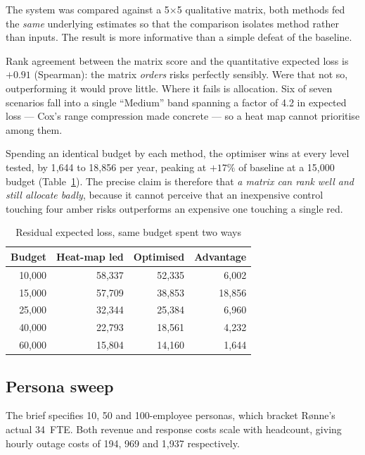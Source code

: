 \documentclass[conference]{IEEEtran}
\newcommand{\eur}{\mbox{\texteuro}}
\begin{document}
The system was compared against a 5$\times$5 qualitative matrix, both methods fed
the \emph{same} underlying estimates so that the comparison isolates method rather
than inputs. The result is more informative than a simple defeat of the baseline.

Rank agreement between the matrix score and the quantitative expected loss is
$+0.91$ (Spearman): the matrix \emph{orders} risks perfectly sensibly. Were that
not so, outperforming it would prove little. Where it fails is allocation. Six of
seven scenarios fall into a single ``Medium'' band spanning a factor of 4.2 in
expected loss --- Cox's range compression \cite{cox2008} made concrete --- so a heat
map cannot prioritise among them.

Spending an identical budget by each method, the optimiser wins at every level
tested, by \eur{}1{,}644 to \eur{}18{,}856 per year, peaking at $+17\%$ of baseline
at a \eur{}15{,}000 budget (Table~\ref{tab:duel}). The precise claim is therefore
that \emph{a matrix can rank well and still allocate badly}, because it cannot
perceive that an inexpensive control touching four amber risks outperforms an
expensive one touching a single red.

\begin{table}[t]
\caption{Residual expected loss, same budget spent two ways}
\label{tab:duel}
\centering
\footnotesize
\begin{tabular}{@{}rrrr@{}}
\toprule
\textbf{Budget} & \textbf{Heat-map led} & \textbf{Optimised} & \textbf{Advantage} \\
\midrule
\eur{}10,000 & \eur{}58,337 & \eur{}52,335 & \eur{}6,002 \\
\eur{}15,000 & \eur{}57,709 & \eur{}38,853 & \eur{}18,856 \\
\eur{}25,000 & \eur{}32,344 & \eur{}25,384 & \eur{}6,960 \\
\eur{}40,000 & \eur{}22,793 & \eur{}18,561 & \eur{}4,232 \\
\eur{}60,000 & \eur{}15,804 & \eur{}14,160 & \eur{}1,644 \\
\bottomrule
\end{tabular}
\end{table}

\subsection{Persona sweep}

The brief specifies 10, 50 and 100-employee personas, which bracket Rønne's actual
34~FTE. Both revenue and response costs scale with headcount, giving hourly outage
costs of \eur{}194, \eur{}969 and \eur{}1{,}937 respectively.
\end{document}
